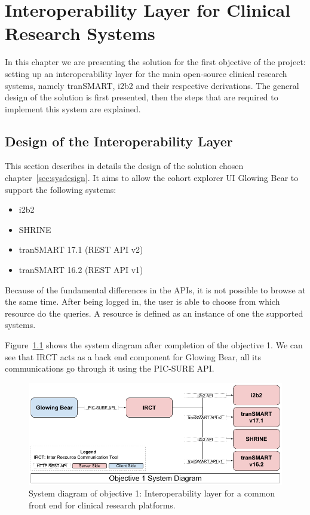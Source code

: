 
\chapter{Interoperability Layer for Clinical Research Systems}

In this chapter we are presenting the solution for the first objective of the project:
setting up an interoperability layer for the main open-source clinical research systems, namely tranSMART, i2b2 and their respective derivations.
The general design of the solution is first presented, then the steps that are required to implement this system are explained.

\section{Design of the Interoperability Layer}

This section describes in details the design of the solution chosen chapter~\ref{sec:sysdesign}. 
It aims to allow the cohort explorer UI Glowing Bear to support the following systems:
\begin{itemize}
    \item i2b2
    \item SHRINE 
    \item tranSMART 17.1 (REST API v2)
    \item tranSMART 16.2 (REST API v1)
\end{itemize}

Because of the fundamental differences in the APIs, it is not possible to browse at the same time. 
After being logged in, the user is able to choose from which resource do the queries.
A resource is defined as an instance of one the supported systems.

Figure~\ref{fig:sysdiagramobj1} shows the system diagram after completion of the objective 1.
We can see that IRCT acts as a back end component for Glowing Bear, all its communications go through it using the PIC-SURE API.

\begin{figure}[h!]
    \centering
    \includegraphics[width=1\textwidth]{figures/sys_diagram_obj1.png}
    \caption{System diagram of objective 1: Interoperability layer for a common front end for clinical research platforms.}
    \label{fig:sysdiagramobj1}
\end{figure}

